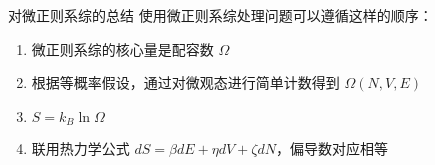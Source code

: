 \begin{understanding}{\kaishu 对微正则系综的总结}
\kaishu \fontsize{11pt}{16pt}
\quad\quad 使用微正则系综处理问题可以遵循这样的顺序：
    \begin{enumerate}
        \item 微正则系综的核心量是配容数 $\Omega$
        \item 根据等概率假设，通过对微观态进行简单计数得到 $\Omega(N,V,E)$
        \item $S = k_B \ln \Omega$
        \item 联用热力学公式 $dS = \beta dE + \eta dV + \zeta dN$，偏导数对应相等
    \end{enumerate}

\end{understanding}

